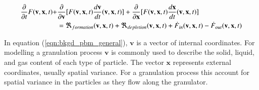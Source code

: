 \documentclass[preprint,11pt,authoryear]{elsarticle}
\begin{document}
	    \begin{align}
	    \frac{ \partial}{\partial t}F(\textbf{v},\textbf{x},t) +& \frac{\partial}{\partial 
            \textbf{v}}[F(\textbf{v},\textbf{x},t)\frac{d\textbf{v}}{dt}(\textbf{v},\textbf{x},t)] + 
        \frac{\partial}{\partial \textbf{x}}[F(\textbf{v},\textbf{x},t)\frac{d\textbf{x}}{dt}(\textbf{v},\textbf{x},t)] 
        \notag\\
	    &= 
        \Re_{formation}(\textbf{v},\textbf{x},t)+\Re_{depletion}(\textbf{v},\textbf{x},t)+\dot{F}_{in}(\textbf{v},
        \textbf{x},t)-\dot{F}_{out}(\textbf{v},\textbf{x},t)
	    \label{eqn:bkgd_pbm_general} 
	    \end{align}
	    
    \par In equation (\ref{eqn:bkgd_pbm_general}), $\textbf{v}$ is a vector of internal coordinates. For 
    modelling a granulation process $\textbf{v}$ is commonly used to describe the solid, liquid, and gas 
    content of each type of particle. The vector $\textbf{x}$ represents external coordinates, usually 
    spatial variance. For a granulation process this  account for spatial variance in the particles as they 
    flow along the granulator.
    
\end{document}

